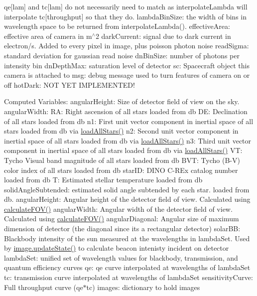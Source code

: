 \begin{DoxyEnumerate}
\item qe\mbox{[}\textquotesingle{}lam\textquotesingle{}\mbox{]} and tc\mbox{[}\textquotesingle{}lam\textquotesingle{}\mbox{]} do not necessarily need to match as interpolate\+Lambda will interpolate tc\mbox{[}\textquotesingle{}throughput\textquotesingle{}\mbox{]} so that they do. lambda\+Bin\+Size\+: the width of bins in wavelength space to be returned from interpolate\+Lambda(). effective\+Area\+: effective area of camera in m$^\wedge$2 dark\+Current\+: signal due to dark current in electron/s. Added to every pixel in image, plus poisson photon noise read\+Sigma\+: standard deviation for gaussian read noise dn\+Bin\+Size\+: number of photons per intensity bin dn\+Depth\+Max\+: saturation level of detector sc\+: Spacecraft object this camera is attached to msg\+: debug message used to turn features of camera on or off hot\+Dark\+: N\+OT Y\+ET I\+M\+P\+L\+E\+M\+E\+N\+T\+E\+D!
\end{DoxyEnumerate}

Computed Variables\+: angular\+Height\+: Size of detector field of view on the sky. angular\+Width\+: RA\+: Right ascension of all stars loaded from db DE\+: Declination of all stars loaded from db n1\+: First unit vector component in inertial space of all stars loaded from db via \hyperlink{classcamera_1_1camera_a19a245a417b72f0ae753b5200b1615ff}{load\+All\+Stars()} n2\+: Second unit vector component in inertial space of all stars loaded from db via \hyperlink{classcamera_1_1camera_a19a245a417b72f0ae753b5200b1615ff}{load\+All\+Stars()} n3\+: Third unit vector component in inertial space of all stars loaded from db via \hyperlink{classcamera_1_1camera_a19a245a417b72f0ae753b5200b1615ff}{load\+All\+Stars()} VT\+: Tycho Visual band magnitude of all stars loaded from db B\+VT\+: Tycho (B-\/V) color index of all stars loaded from db star\+ID\+: D\+I\+NO C-\/\+R\+Ex catalog number loaded from db T\+: Estimated stellar temperature loaded from db solid\+Angle\+Subtended\+: estimated solid angle subtended by each star. loaded from db. angular\+Height\+: Angular height of the detector field of view. Calculated using \hyperlink{classcamera_1_1camera_ad4494bee9257f3d3456b93d26ba9a5a0}{calculate\+F\+O\+V()} angular\+Width\+: Angular width of the detector field of view. Calculated using \hyperlink{classcamera_1_1camera_ad4494bee9257f3d3456b93d26ba9a5a0}{calculate\+F\+O\+V()} angular\+Diagonal\+: Angular size of maximum dimension of detector (the diagonal since it\textquotesingle{}s a rectangular detector) solar\+BB\+: Blackbody intensity of the sun measured at the wavelengths in lambda\+Set. Used by \hyperlink{classcamera_1_1image_ad5fcc766f1a0be37d8437f46d0fe720d}{image.\+update\+State()} to calculate beacon intenisty incident on detector lambda\+Set\+: unified set of wavelength values for blackbody, transmission, and quantum efficiency curves qe\+: qe curve interpolated at wavelengths of lambda\+Set tc\+: transmission curve interpolated at wavelengths of lambda\+Set sensitivity\+Curve\+: Full throughput curve (qe$\ast$tc) images\+: dictionary to hold images

